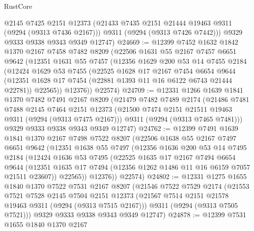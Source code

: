 \begin{lexlean}{RustCore}
\begin{coremodule}
        @2145
        @7425
        @2151
        @12373
        (@21433 @7435 @2151 @21444 @19463 @9311 (@9294 (@9313 @7436 @2167)))
        @9311
        (@9294 (@9313 @7426 @7442)))
      @9329
      @9333
      @9338
      @9343
      @9349
      @12747)
@24669 := @12399
    @7452
    @1632
    @1842
    @1370
    @2167
    @7458
    @7482
    @8209
    (@22506
      @1631
      @55
      @2167
      @7457
      @6651
      @9642
      (@12351
        @1631
        @55
        @7457
        (@12356
          @1629
          @200
          @53
          @14
          @7455
          @2184
          (@12424
            @1629
            @53
            @7455
            (@22525
              @1628
              @17
              @2167
              @7454
              @6654
              @9644
              (@12351 @1628 @17 @7454 (@22881 @1393 @11 @16 @6122 @6743 @21444 @22781))
              @22565))
          @12376))
      @22574)
@24709 := @12331
    @1266
    @1639
    @1841
    @1370
    @7482
    @7491
    @2167
    @8209
    (@21479
      @7482
      @7489
      @2174
      (@21486
        @7481
        @7488
        @2145
        @7464
        @2151
        @12373
        (@21500 @7474 @2151 @21511 @19463 @9311 (@9294 (@9313 @7475 @2167)))
        @9311
        (@9294 (@9313 @7465 @7481)))
      @9329
      @9333
      @9338
      @9343
      @9349
      @12747)
@24762 := @12399
    @7491
    @1639
    @1841
    @1370
    @2167
    @7498
    @7522
    @8207
    (@22506
      @1638
      @55
      @2167
      @7497
      @6651
      @9642
      (@12351
        @1638
        @55
        @7497
        (@12356
          @1636
          @200
          @53
          @14
          @7495
          @2184
          (@12424
            @1636
            @53
            @7495
            (@22525
              @1635
              @17
              @2167
              @7494
              @6654
              @9644
              (@12351 @1635 @17 @7494 (@12356 @1262 @1486 @11 @16 @6159 @7057 @21511 @23607))
              @22565))
          @12376))
      @22574)
@24802 := @12331
    @1275
    @1655
    @1840
    @1370
    @7522
    @7531
    @2167
    @8207
    (@21546
      @7522
      @7529
      @2174
      (@21553
        @7521
        @7528
        @2145
        @7504
        @2151
        @12373
        (@21567 @7514 @2151 @21578 @19463 @9311 (@9294 (@9313 @7515 @2167)))
        @9311
        (@9294 (@9313 @7505 @7521)))
      @9329
      @9333
      @9338
      @9343
      @9349
      @12747)
@24878 := @12399
    @7531
    @1655
    @1840
    @1370
    @2167

\end{coremodule}
\end{lexlean}
